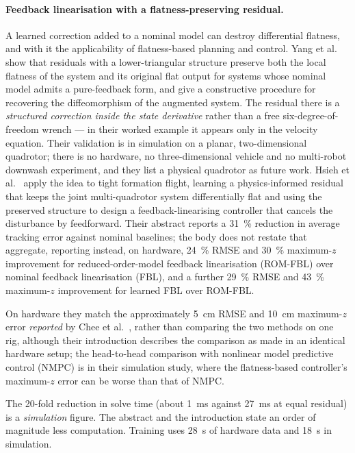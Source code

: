 \paragraph{Feedback linearisation with a flatness-preserving residual.}
A learned correction added to a nominal model can destroy differential flatness, and with it the
applicability of flatness-based planning and control. Yang et al.~\cite{yang2025flatnessresiduals}
show that residuals with a lower-triangular structure preserve both the local flatness of the system
and its original flat output for systems whose nominal model admits a pure-feedback form, and give
a constructive procedure for recovering the diffeomorphism of the augmented system. The residual
there is a \emph{structured correction inside the state derivative} rather than a free
six-degree-of-freedom wrench --- in their worked example it appears only in the velocity equation.
Their validation is in simulation on a planar, two-dimensional quadrotor; there is no hardware, no
three-dimensional vehicle and no multi-robot downwash experiment, and they list a physical quadrotor
as future work. Hsieh et
al.~\cite{hsieh2026flatness} apply the idea to tight formation flight, learning a physics-informed
residual that keeps the joint multi-quadrotor system differentially flat and using the preserved
structure to design a feedback-linearising controller that cancels the disturbance by feedforward.
Their abstract reports a \SI{31}{\percent} reduction in average tracking error against nominal
baselines; the body does not restate that aggregate, reporting instead, on hardware, \SI{24}{\percent}
RMSE and \SI{30}{\percent} maximum-\(z\) improvement for reduced-order-model feedback linearisation (ROM-FBL) over nominal feedback linearisation (FBL), and a further
\SI{29}{\percent} RMSE and \SI{43}{\percent} maximum-\(z\) improvement for learned FBL over
ROM-FBL.

On hardware they match the approximately \SI{5}{\centi\metre} RMSE and \SI{10}{\centi\metre}
maximum-\(z\) error \emph{reported} by Chee et al.~\cite{chee2024knodedwmpc}, rather than
comparing the two methods on one rig, although their introduction describes the comparison as
made in an identical hardware setup; the head-to-head comparison with nonlinear model predictive
control (NMPC) is in their simulation study, where the flatness-based controller's
maximum-\(z\) error can be worse than that of NMPC.

The \num{20}-fold reduction in solve time (about \SI{1}{\milli\second} against
\SI{27}{\milli\second} at equal residual) is a \emph{simulation} figure. The abstract and the
introduction state an order of magnitude less computation. Training uses \SI{28}{\second} of hardware data
and \SI{18}{\second} in simulation.

